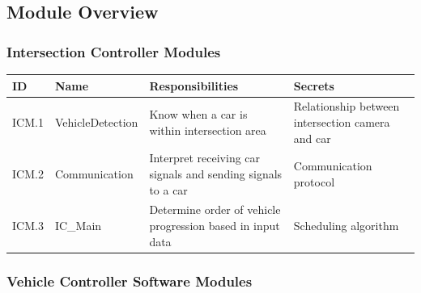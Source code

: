 \documentclass [10pt]{article}
\begin{document}
\subsection{Module Overview}

\subsubsection{Intersection Controller Modules}

\begin{longtable}{ |p{ }  | p{ } |  p{ } |  p{ } |}  \hline
    
    \textbf{ID} & \textbf{Name} &  \textbf{Responsibilities} & \textbf{Secrets} \\ \hline
    

    
    \rowcolor{tableCell}ICM.1 & VehicleDetection & Know when a car is within intersection area & Relationship between intersection camera and car \\ \hline
    
    ICM.2  &Communication & Interpret receiving car signals and sending signals to a car & Communication protocol \\ \hline
    
    
        \rowcolor{tableCell}ICM.3 & IC\_Main & Determine order of vehicle progression based in input data & Scheduling algorithm   \\ \hline

\end{longtable}


\subsubsection{Vehicle Controller Software Modules}
\end{document}
